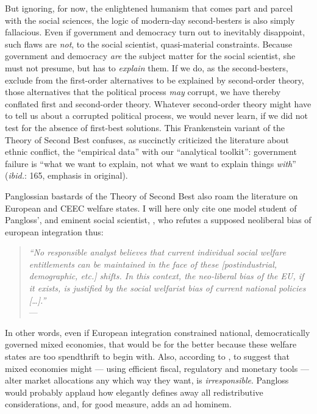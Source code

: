\documentclass[11pt,a4paper,oneside,openright]{article}
\begin{document}
But ignoring, for now, the enlightened humanism that comes part and parcel with the social sciences, the logic of modern-day second-besters is also simply fallacious. 
Even if government and democracy turn out to inevitably disappoint, such flaws are \emph{not}, to the social scientist, quasi-material constraints. 
Because government and democracy \emph{are} the subject matter for the social scientist, she must not presume, but has to \emph{explain} them. 
If we do, as the second-besters, exclude from the first-order alternatives to be explained by second-order theory, those alternatives that the political process \emph{may} corrupt, we have thereby conflated first and second-order theory. 
Whatever second-order theory might have to tell us about a corrupted political process, we would never learn, if we did not test for the absence of first-best solutions. 
This Frankenstein variant of the Theory of Second Best confuses, as \cite{Brubaker-2002-aa} succinctly criticized the literature about ethnic conflict, the ``empirical data'' with our ``analytical toolkit'': 
government failure is ``what we want to explain, not what we want to explain things \emph{with}'' (\emph{ibid.}: 165, emphasis in original).

Panglossian bastards of the Theory of Second Best also roam the literature on European and \gls{CEEC} welfare states. 
I will here only cite one model student of Pangloss', and eminent social scientist, \citeauthor{Moravcsik-2002-aa}, who refutes a supposed neoliberal bias of european integration thus:
\begin{quote}
	\emph{``No responsible analyst believes that current individual social welfare entitlements can be maintained in the face of these [postindustrial, demographic, etc.] shifts. 
	In this context, the neo-liberal bias of the \gls{EU}, if it exists, is justified by the social welfarist bias of current national policies [\ldots].''}\\
	--- \cite[618]{Moravcsik-2002-aa}
\end{quote} %
In other words, even if European integration constrained national, democratically governed mixed economies, that would be for the better because these welfare states are too spendthrift to begin with. 
Also, according to \citeauthor{Moravcsik-2002-aa}, to suggest that mixed economies might --- using efficient fiscal, regulatory and monetary tools --- alter market allocations any which way they want, is \emph{irresponsible}. 
Pangloss would probably applaud how elegantly \citeauthor{Moravcsik-2002-aa} defines away all redistributive considerations, and, for good measure, adds an ad hominem. 
\end{document}
